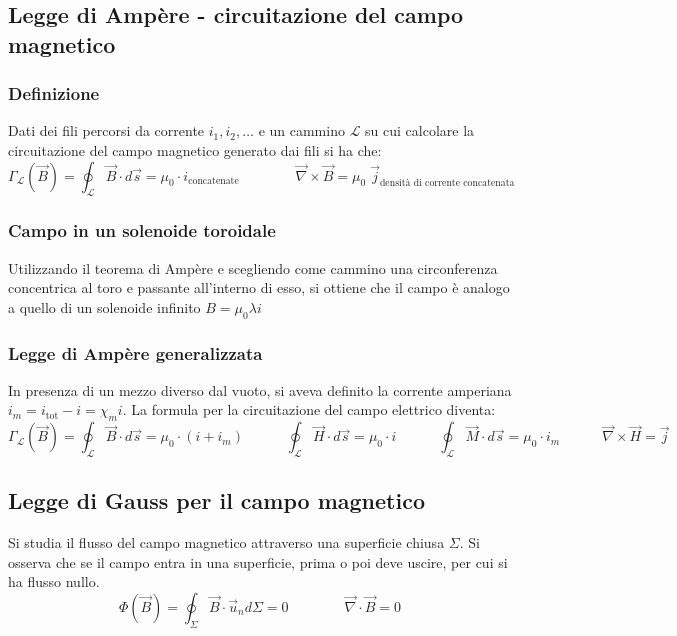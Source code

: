 \documentclass[a4paper]{article}
\newcommand\un{\vec{u}_n}
\newcommand\nab{\vec{\nabla}} %
\begin{document}
\subsection{Legge di Ampère - circuitazione del campo magnetico}
\subsubsection*{Definizione}
Dati dei fili percorsi da corrente \(i_1, i_2, \dots\) e un cammino \(\mathcal{L}\) su cui calcolare la circuitazione del campo
magnetico generato dai fili si ha che:
\[\Gamma_\mathcal{L} (\vec{B}) = \oint_\mathcal{L} \vec{B} \cdot d\vec{s} = \mu_0 \cdot i_\text{concatenate} \qquad \qquad \nab \times \vec{B} = \mu_0 \; \vec{j}_\text{densità di corrente concatenata}\]

\subsubsection*{Campo in un solenoide toroidale}
Utilizzando il teorema di Ampère e scegliendo come cammino una circonferenza concentrica al toro e passante all'interno di esso,
si ottiene che il campo è analogo a quello di un solenoide infinito \(B = \mu_0 \lambda i\)

\subsubsection*{Legge di Ampère generalizzata}
In presenza di un mezzo diverso dal vuoto, si aveva definito la corrente amperiana \(i_m = i_\text{tot} - i = \chi_m i\). La
formula per la circuitazione del campo elettrico diventa:
\[\Gamma_\mathcal{L} (\vec{B}) = \oint_\mathcal{L} \vec{B} \cdot d\vec{s} = \mu_0 \cdot (i + i_m) \qquad\quad \oint_\mathcal{L} \vec{H} \cdot d\vec{s} = \mu_0 \cdot i \qquad\quad \oint_\mathcal{L} \vec{M} \cdot d\vec{s} = \mu_0 \cdot i_m \qquad\quad \nab \times \vec{H} = \vec{j}\]

\subsection{Legge di Gauss per il campo magnetico}
Si studia il flusso del campo magnetico attraverso una superficie chiusa \(\Sigma\). Si osserva che se il campo
entra in una superficie, prima o poi deve uscire, per cui si ha flusso nullo.
\[\Phi(\vec{B}) = \oint_\Sigma \vec{B} \cdot \un d\Sigma = 0 \qquad \qquad \nab \cdot \vec{B} = 0\]
\end{document}
